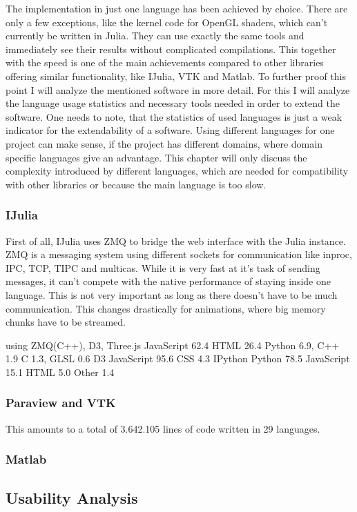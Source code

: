 The implementation in just one language has been achieved by choice. There are only a few exceptions, like the kernel code for OpenGL shaders, which can't currently be written in Julia. 
They can use exactly the same tools and immediately see their results without complicated compilations.
This together with the speed is one of the main achievements compared to other libraries offering similar functionality, like IJulia, VTK and Matlab.
To further proof this point I will analyze the mentioned software in more detail.
For this I will analyze the language usage statistics and necessary tools needed in order to extend the software.
One needs to note, that the statistics of used languages is just a weak indicator for the extendability of a software.
Using different languages for one project can make sense, if the project has different domains, where domain specific languages give an advantage.
This chapter will only discuss the complexity introduced by different languages, which are needed for compatibility with other libraries or because the main language is too slow.

\subsubsection{IJulia}
First of all, IJulia uses ZMQ to bridge the web interface with the Julia instance.
ZMQ is a messaging system using different sockets for communication like inproc, IPC, TCP, TIPC and multicas.
While it is very fast at it's task of sending messages, it can't compete with the native performance of staying inside one language.
This is not very important as long as there doesn't have to be much communication. This changes drastically for animations, where big memory chunks have to be streamed.

using ZMQ(C++), D3, 
Three.js
JavaScript 62.4	 HTML 26.4	 Python 6.9,	 C++ 1.9	 C 1.3,	 GLSL 0.6
D3
JavaScript 95.6	 CSS 4.3
IPython
Python 78.5	 JavaScript 15.1	 HTML 5.0	 Other 1.4

\subsubsection{Paraview and VTK}



This amounts to a total of 3.642.105 lines of code written in 29 languages.

\subsubsection{Matlab}



\subsection{Usability Analysis}
